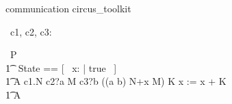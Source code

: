 \begin{zsection}
   \SECTION communication \parents circus\_toolkit
\end{zsection}

\begin{circus}
   \circchannel\ c1, c2, c3: \boolean
\end{circus}

\begin{circus}
    \circprocess\ P \circdef \circbegin \\
    	\t1 \circstate\ State == [~ x: \nat | true ~] \\
        \t1 A \circdef c1.\true \circat N \then c2?a \circat M \then 
        			c3?b \prefixcolon ((a \implies b) \land N+x \leq M) 
        				\circat K \then x := x + K \\
        \t1 \circspot A \\
    \circend
\end{circus}

